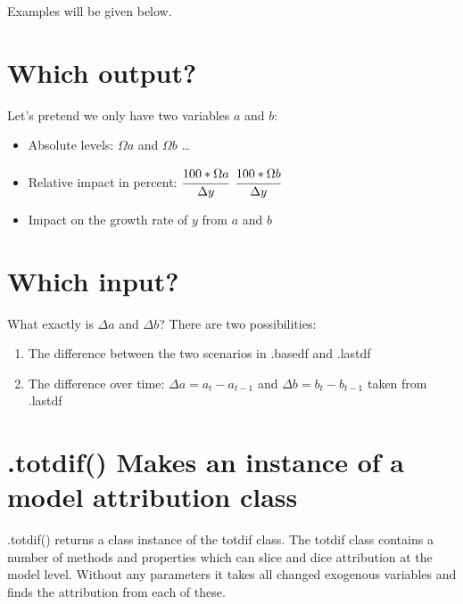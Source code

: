 \documentclass[letterpaper,10pt,english]{jupyterBook}
\begin{document}
\sphinxAtStartPar
Examples will be given below.


\section{Which output?}
\label{\detokenize{content/howto/attribution/Attribution background:which-output}}
\sphinxAtStartPar
Let’s pretend we only have two variables \(a\) and \(b\):
\begin{itemize}
\item {} 
\sphinxAtStartPar
Absolute levels:  \(\Omega a\) and \(\Omega b\) …

\item {} 
\sphinxAtStartPar
Relative impact in percent:  \(\cfrac{100*\Omega a}{\Delta y}\)  \(\cfrac{100*\Omega b}{\Delta y}\)

\item {} 
\sphinxAtStartPar
Impact on the growth rate of \(y\) from  \(a\) and \(b\)

\end{itemize}


\section{Which input?}
\label{\detokenize{content/howto/attribution/Attribution background:which-input}}
\sphinxAtStartPar
What exactly is \(\Delta a\) and \(\Delta b\)? There are two possibilities:
\begin{enumerate}
%
\item {} 
\sphinxAtStartPar
The difference between the two scenarios in .basedf and .lastdf

\item {} 
\sphinxAtStartPar
The difference over time: \(\Delta a = a_t - a_{t-1}\) and \(\Delta b = b_t - b_{t-1}\) taken from .lastdf

\end{enumerate}


\section{.totdif() Makes an instance of a  model attribution class}
\label{\detokenize{content/howto/attribution/Attribution background:totdif-makes-an-instance-of-a-model-attribution-class}}
\sphinxAtStartPar
.totdif() returns a class instance of the totdif class. The totdif class contains a number of
methods and properties which can slice and dice attribution at the model level. Without any parameters it
takes all changed exogenous variables and finds the attribution from each of these.
\end{document}
